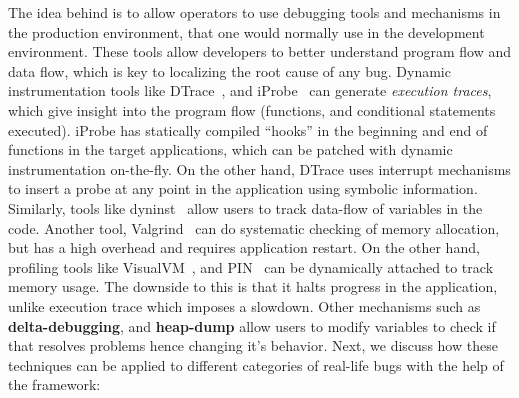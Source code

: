 The idea behind \parikshan is to allow operators to use debugging tools and mechanisms in the production environment, that one would normally use in the development environment.
These tools allow developers to better understand program flow and data flow, which is key to localizing the root cause of any bug.
Dynamic instrumentation tools like DTrace~\cite{dtrace}, and iProbe~\cite{iProbe} can generate \emph{execution traces}, which give insight into the program flow (functions, and conditional statements executed).
iProbe has statically compiled ``hooks'' in the beginning and end of functions in the target applications, which can be patched with dynamic instrumentation on-the-fly.
On the other hand, DTrace uses interrupt mechanisms to insert a probe at any point in the application using symbolic information. 
Similarly, tools like dyninst~\cite{dyninst} allow users to track data-flow of variables in the code.
Another tool, Valgrind~\cite{valgrind} can do systematic checking of memory allocation, but has a high overhead and requires application restart.
On the other hand, profiling tools like VisualVM~\cite{visualvm}, and PIN~\cite{pin} can be dynamically attached to track memory usage. 
The downside to this is that it halts progress in the application, unlike execution trace which imposes a slowdown. 
Other mechanisms such as \textbf{delta-debugging}, and \textbf{heap-dump} allow users to modify variables to check if that resolves problems hence changing it's behavior.
Next, we discuss how these techniques can be applied to different categories of real-life bugs with the help of the \parikshan framework:


